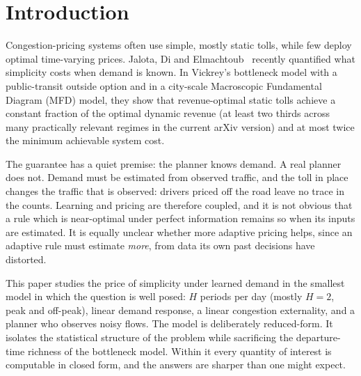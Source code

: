 \documentclass[11pt]{article}
\theoremstyle{definition}
\theoremstyle{remark}
\begin{document}
\section{Introduction}\label{sec:intro}
Congestion-pricing systems often use simple, mostly static tolls, while few deploy optimal time-varying prices. Jalota, Di and Elmachtoub~\cite{jde2026} recently quantified what simplicity costs when demand is known. In Vickrey's bottleneck model with a public-transit outside option and in a city-scale Macroscopic Fundamental Diagram (MFD) model, they show that revenue-optimal static tolls achieve a constant fraction of the optimal dynamic revenue (at least two thirds across many practically relevant regimes in the current arXiv version) and at most twice the minimum achievable system cost.

The guarantee has a quiet premise: the planner knows demand. A real planner does not. Demand must be estimated from observed traffic, and the toll in place changes the traffic that is observed: drivers priced off the road leave no trace in the counts. Learning and pricing are therefore coupled, and it is not obvious that a rule which is near-optimal under perfect information remains so when its inputs are estimated. It is equally unclear whether more adaptive pricing helps, since an adaptive rule must estimate \emph{more}, from data its own past decisions have distorted.

This paper studies the price of simplicity under learned demand in the smallest model in which the question is well posed: $H$ periods per day (mostly $H=2$, peak and off-peak), linear demand response, a linear congestion externality, and a planner who observes noisy flows. The model is deliberately reduced-form. It isolates the statistical structure of the problem while sacrificing the departure-time richness of the bottleneck model. Within it every quantity of interest is computable in closed form, and the answers are sharper than one might expect.
\end{document}
